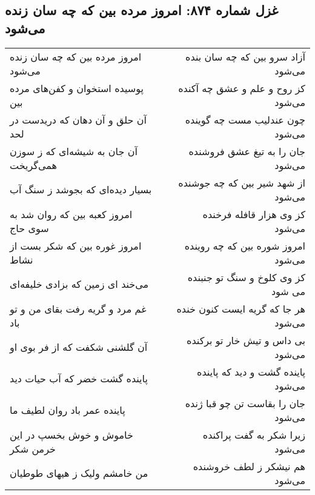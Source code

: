 \begin{center}
\section*{غزل شماره ۸۷۴: امروز مرده بین که چه سان زنده می‌شود}
\label{sec:0874}
\begin{longtable}{l p{0.5cm} r}
امروز مرده بین که چه سان زنده می‌شود
&&
آزاد سرو بین که چه سان بنده می‌شود
\\
پوسیده استخوان و کفن‌های مرده بین
&&
کز روح و علم و عشق چه آکنده می‌شود
\\
آن حلق و آن دهان که دریدست در لحد
&&
چون عندلیب مست چه گوینده می‌شود
\\
آن جان به شیشه‌ای که ز سوزن همی‌گریخت
&&
جان را به تیغ عشق فروشنده می‌شود
\\
بسیار دیده‌ای که بجوشد ز سنگ آب
&&
از شهد شیر بین که چه جوشنده می‌شود
\\
امروز کعبه بین که روان شد به سوی حاج
&&
کز وی هزار قافله فرخنده می‌شود
\\
امروز غوره بین که شکر بست از نشاط
&&
امروز شوره بین که چه روینده می‌شود
\\
می‌خند ای زمین که بزادی خلیفه‌ای
&&
کز وی کلوخ و سنگ تو جنبنده می شود
\\
غم مرد و گریه رفت بقای من و تو باد
&&
هر جا که گریه ایست کنون خنده می‌شود
\\
آن گلشنی شکفت که از فر بوی او
&&
بی داس و تیش خار تو برکنده می‌شود
\\
پاینده گشت خضر که آب حیات دید
&&
پاینده گشت و دید که پاینده می‌شود
\\
پاینده عمر باد روان لطیف ما
&&
جان را بقاست تن چو قبا ژنده می‌شود
\\
خاموش و خوش بخسپ در این خرمن شکر
&&
زیرا شکر به گفت پراکنده می‌شود
\\
من خامشم ولیک ز هیهای طوطیان
&&
هم نیشکر ز لطف خروشنده می‌شود
\\
\end{longtable}
\end{center}
